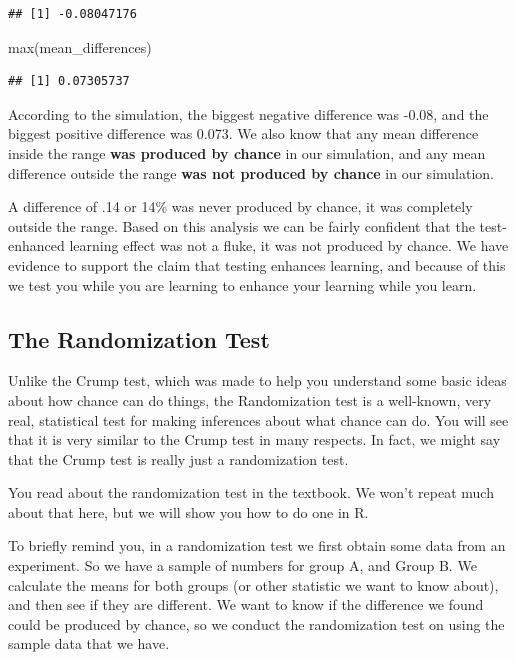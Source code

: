 \documentclass[
]{book}
\newenvironment{Shaded}{\begin{snugshade}}{\end{snugshade}}
\newcommand{\FunctionTok}[1]{\textcolor[rgb]{0.00,0.00,0.00}{#1}}
\newcommand{\NormalTok}[1]{#1}
\begin{document}
\begin{verbatim}
## [1] -0.08047176
\end{verbatim}

\begin{Shaded}
\begin{Highlighting}[]
\FunctionTok{max}\NormalTok{(mean\_differences)}
\end{Highlighting}
\end{Shaded}

\begin{verbatim}
## [1] 0.07305737
\end{verbatim}

According to the simulation, the biggest negative difference was -0.08, and the biggest positive difference was 0.073. We also know that any mean difference inside the range \textbf{was produced by chance} in our simulation, and any mean difference outside the range \textbf{was not produced by chance} in our simulation.

A difference of .14 or 14\% was never produced by chance, it was completely outside the range. Based on this analysis we can be fairly confident that the test-enhanced learning effect was not a fluke, it was not produced by chance. We have evidence to support the claim that testing enhances learning, and because of this we test you while you are learning to enhance your learning while you learn.

\hypertarget{the-randomization-test}{%
\subsection{The Randomization Test}\label{the-randomization-test}}

Unlike the Crump test, which was made to help you understand some basic ideas about how chance can do things, the Randomization test is a well-known, very real, statistical test for making inferences about what chance can do. You will see that it is very similar to the Crump test in many respects. In fact, we might say that the Crump test is really just a randomization test.

You read about the randomization test in the textbook. We won't repeat much about that here, but we will show you how to do one in R.

To briefly remind you, in a randomization test we first obtain some data from an experiment. So we have a sample of numbers for group A, and Group B. We calculate the means for both groups (or other statistic we want to know about), and then see if they are different. We want to know if the difference we found could be produced by chance, so we conduct the randomization test on using the sample data that we have.
\end{document}
